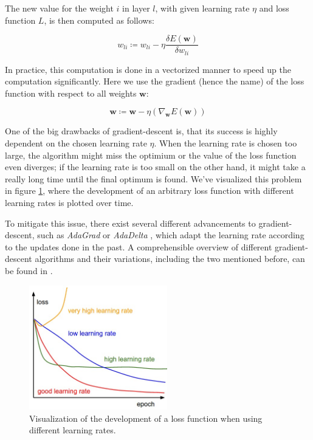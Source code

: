 The new value for the weight $i$ in layer $l$, with given learning rate $\eta$ and loss function $L$, is then computed as follows:

\begin{equation}
\label{fundamentals:equation:gradient_descent}
w_{li} \coloneqq w_{li} - \eta \frac{\delta E(\mathbf{w})}{\delta w_{li}}
\end{equation}

In practice, this computation is done in a vectorized manner to speed up the computation significantly. Here we use the gradient (hence the name) of the loss function with respect to all weights $\mathbf{w}$:

\begin{equation}
\mathbf{w} \coloneqq \mathbf{w} - \eta(\nabla_{\mathbf{w}}E(\mathbf{w}))
\end{equation}

One of the big drawbacks of gradient-descent is, that its success is highly dependent on the chosen learning rate $\eta$. When the learning rate is chosen too large, the algorithm might miss the optimium or the value of the loss function even diverges; if the learning rate is too small on the other hand, it might take a really long time until the final optimum is found. We've visualized this problem in figure \ref{fundamentals:figures:learning_rates}, where the development of an arbitrary loss function with different learning rates is plotted over time.

To mitigate this issue, there exist several different advancements to gradient-descent, such as \emph{AdaGrad} \cite{Duchi:2011} or \emph{AdaDelta} \cite{Zeiler:2012}, which adapt the learning rate according to the updates done in the past. A comprehensible overview of different gradient-descent algorithms and their variations, including the two mentioned before, can be found in \cite{Ruder:2016}.

\begin{figure}[h]
	\centering
	\includegraphics[width=6cm]{img/learning_rates_comparison}
	\caption{Visualization of the development of a loss function when using different learning rates.\protect\footnotemark}
	\label{fundamentals:figures:learning_rates}
\end{figure}
